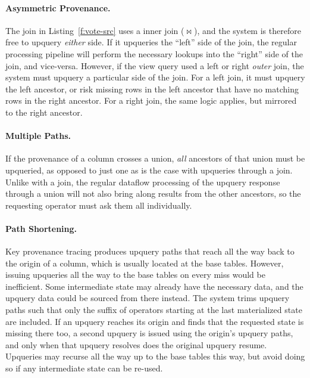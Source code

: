 \paragraph{Asymmetric Provenance.}
The join in Listing~\ref{f:vote-src} uses a inner join ($\bowtie$), and the
system is therefore free to upquery \emph{either} side. If it upqueries the
``left'' side of the join, the regular processing pipeline will perform the
necessary lookups into the ``right'' side of the join, and vice-versa. However,
if the view query used a left or right \emph{outer} join, the system must
upquery a particular side of the join. For a left join, it must upquery the left
ancestor, or risk missing rows in the left ancestor that have no matching rows
in the right ancestor. For a right join, the same logic applies, but mirrored to
the right ancestor.

\paragraph{Multiple Paths.}
If the provenance of a column crosses a union, \emph{all} ancestors of that
union must be upqueried, as opposed to just one as is the case with upqueries
through a join. Unlike with a join, the regular dataflow processing of the
upquery response through a union will not also bring along results from the
other ancestors, so the requesting operator must ask them all individually.

\paragraph{Path Shortening.}
Key provenance tracing produces upquery paths that reach all the way back to the
origin of a column, which is usually located at the base tables. However,
issuing upqueries all the way to the base tables on every miss would be
inefficient. Some intermediate state may already have the necessary data, and
the upquery data could be sourced from there instead. The system trims upquery
paths such that only the suffix of operators starting at the last materialized
state are included. If an upquery reaches its origin and finds that the
requested state is missing there too, a second upquery is issued using the
origin's upquery paths, and only when that upquery resolves does the original
upquery resume. Upqueries may recurse all the way up to the base tables this
way, but avoid doing so if any intermediate state can be re-used.

